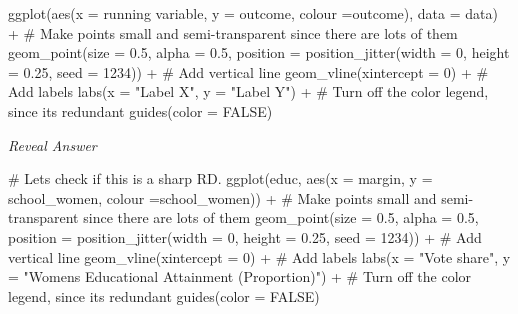 \documentclass[
  letterpaper,
  DIV=11,
  numbers=noendperiod]{scrreprt}
\newenvironment{Shaded}{\begin{snugshade}}{\end{snugshade}}
\newcommand{\AttributeTok}[1]{\textcolor[rgb]{0.40,0.45,0.13}{#1}}
\newcommand{\CommentTok}[1]{\textcolor[rgb]{0.37,0.37,0.37}{#1}}
\newcommand{\ConstantTok}[1]{\textcolor[rgb]{0.56,0.35,0.01}{#1}}
\newcommand{\DecValTok}[1]{\textcolor[rgb]{0.68,0.00,0.00}{#1}}
\newcommand{\FloatTok}[1]{\textcolor[rgb]{0.68,0.00,0.00}{#1}}
\newcommand{\FunctionTok}[1]{\textcolor[rgb]{0.28,0.35,0.67}{#1}}
\newcommand{\NormalTok}[1]{\textcolor[rgb]{0.00,0.23,0.31}{#1}}
\newcommand{\SpecialCharTok}[1]{\textcolor[rgb]{0.37,0.37,0.37}{#1}}
\newcommand{\StringTok}[1]{\textcolor[rgb]{0.13,0.47,0.30}{#1}}
\begin{document}
\begin{Shaded}
\begin{Highlighting}[]
\FunctionTok{ggplot}\NormalTok{(}\FunctionTok{aes}\NormalTok{(}\AttributeTok{x =}\NormalTok{ running variable, }\AttributeTok{y =}\NormalTok{ outcome, }\AttributeTok{colour =}\NormalTok{outcome), }\AttributeTok{data =}\NormalTok{ data) }\SpecialCharTok{+}
  \CommentTok{\# Make points small and semi{-}transparent since there are lots of them}
  \FunctionTok{geom\_point}\NormalTok{(}\AttributeTok{size =} \FloatTok{0.5}\NormalTok{, }\AttributeTok{alpha =} \FloatTok{0.5}\NormalTok{, }\AttributeTok{position =} \FunctionTok{position\_jitter}\NormalTok{(}\AttributeTok{width =} \DecValTok{0}\NormalTok{, }\AttributeTok{height =} \FloatTok{0.25}\NormalTok{, }\AttributeTok{seed =} \DecValTok{1234}\NormalTok{)) }\SpecialCharTok{+} 
  \CommentTok{\# Add vertical line}
  \FunctionTok{geom\_vline}\NormalTok{(}\AttributeTok{xintercept =} \DecValTok{0}\NormalTok{) }\SpecialCharTok{+} 
  \CommentTok{\# Add labels}
  \FunctionTok{labs}\NormalTok{(}\AttributeTok{x =} \StringTok{"Label X"}\NormalTok{, }\AttributeTok{y =} \StringTok{"Label Y"}\NormalTok{) }\SpecialCharTok{+} 
  \CommentTok{\# Turn off the color legend, since it\textquotesingle{}s redundant}
  \FunctionTok{guides}\NormalTok{(}\AttributeTok{color =} \ConstantTok{FALSE}\NormalTok{)}
\end{Highlighting}
\end{Shaded}

\hfill\break

\emph{Reveal Answer}

\begin{Shaded}
\begin{Highlighting}[]
\CommentTok{\# Let\textquotesingle{}s check if this is a sharp RD. }
\FunctionTok{ggplot}\NormalTok{(educ, }\FunctionTok{aes}\NormalTok{(}\AttributeTok{x =}\NormalTok{ margin, }\AttributeTok{y =}\NormalTok{ school\_women, }\AttributeTok{colour =}\NormalTok{school\_women)) }\SpecialCharTok{+}
  \CommentTok{\# Make points small and semi{-}transparent since there are lots of them}
  \FunctionTok{geom\_point}\NormalTok{(}\AttributeTok{size =} \FloatTok{0.5}\NormalTok{, }\AttributeTok{alpha =} \FloatTok{0.5}\NormalTok{, }
             \AttributeTok{position =} \FunctionTok{position\_jitter}\NormalTok{(}\AttributeTok{width =} \DecValTok{0}\NormalTok{, }\AttributeTok{height =} \FloatTok{0.25}\NormalTok{, }\AttributeTok{seed =} \DecValTok{1234}\NormalTok{)) }\SpecialCharTok{+} 
  \CommentTok{\# Add vertical line}
  \FunctionTok{geom\_vline}\NormalTok{(}\AttributeTok{xintercept =} \DecValTok{0}\NormalTok{) }\SpecialCharTok{+} 
  \CommentTok{\# Add labels}
  \FunctionTok{labs}\NormalTok{(}\AttributeTok{x =} \StringTok{"Vote share"}\NormalTok{, }\AttributeTok{y =} \StringTok{"Womens\textquotesingle{} Educational Attainment (Proportion)"}\NormalTok{) }\SpecialCharTok{+} 
  \CommentTok{\# Turn off the color legend, since it\textquotesingle{}s redundant}
  \FunctionTok{guides}\NormalTok{(}\AttributeTok{color =} \ConstantTok{FALSE}\NormalTok{)}
\end{Highlighting}
\end{Shaded}
\end{document}
